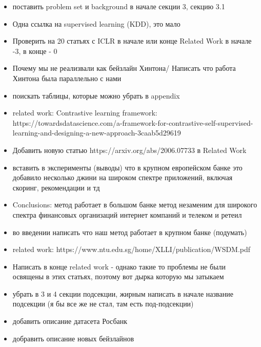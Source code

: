 \documentclass{article}
\begin{document}
\begin{itemize}
\item поставить problem set и background в начале секции 3, секцию 3.1

\item  Одна ссылка на supervised learning (KDD), это мало

\item Проверить на 20 статьях с ICLR в начале или конце Related Work в начале -3, в конце - 0

\item Почему мы не реализвали как бейзлайн Хинтона/ Написать что работа Хинтона была параллельно с нами

\item поискать таблицы, которые можно убрать в appendix

\item related work: Contrastive learning framework: https://towardsdatascience.com/a-framework-for-contrastive-self-supervised-learning-and-designing-a-new-approach-3caab5d29619

\item Добавить новую статью https://arxiv.org/abs/2006.07733 в Related Work

\item вставить в эксперименты (выводы) что в крупном европейском банке это добавило несколько джини на широком спектре приложений, включая скоринг, рекомендации и тд

\item Conclusions: метод работает в большом банке метод незаменим для широкого спектра финансовых организаций интернет компаний и телеком и ретеил 

\item во введении написать что наш метод работает в крупном банке (подумать)

\item related work: https://www.ntu.edu.sg/home/XLLI/publication/WSDM.pdf

\item Написать в конце related work - однако такие то проблемы не были освящены в этих статьях, поэтому вот дырка которую мы затыкаем

\item убрать в 3 и 4 
секции подсекции, жирным написать в начале название подсекции (я бы все же не стал, там есть под-подсекции)

\item добавить описание датасета Росбанк

\item добравить описание новых бейзлайнов


\end{itemize}
\end{document}
